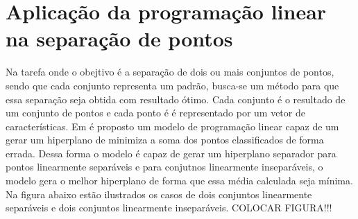 \chapter{Aplicação da programação linear na separação de pontos}

Na tarefa onde o obejtivo é a separação de dois ou mais conjuntos de pontos, sendo que cada conjunto representa um padrão, busca-se um método para que essa separação seja obtida com resultado ótimo. Cada conjunto é o resultado de um conjunto de pontos e cada ponto é é representado por um vetor de características.
Em \cite{Bennett92robustlinear} é proposto um modelo de programação linear capaz de um gerar um hiperplano de minimiza a soma dos pontos classificados de forma errada. Dessa forma o modelo é capaz de gerar um hiperplano separador para pontos linearmente separáveis e para conjutnos linearmente inseparáveis, o modelo gera o melhor hiperplano de forma que essa média calculada seja mínima. Na figura abaixo estão ilustrados os casos de dois conjuntos linearmente separáveis e dois conjuntos linearmente inseparáveis. COLOCAR FIGURA!!!
 
